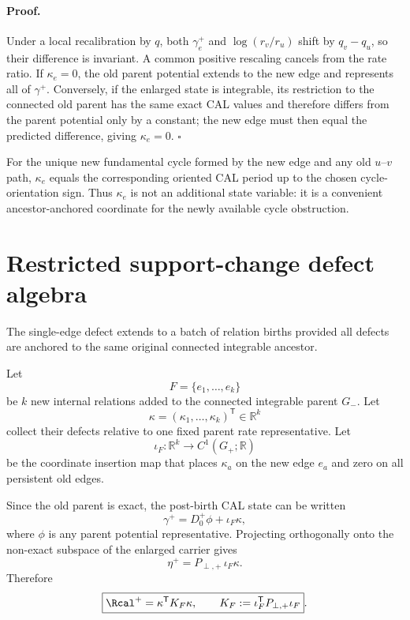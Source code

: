 \paragraph*{Proof.}
Under a local recalibration by $q$, both $\gamma^+_e$ and $\log(r_v/r_u)$ shift by $q_v-q_u$, so their difference is invariant. A common positive rescaling cancels from the rate ratio. If $\kappa_e=0$, the old parent potential extends to the new edge and represents all of $\gamma^+$. Conversely, if the enlarged state is integrable, its restriction to the connected old parent has the same exact CAL values and therefore differs from the parent potential only by a constant; the new edge must then equal the predicted difference, giving $\kappa_e=0$. \hfill$\square$

For the unique new fundamental cycle formed by the new edge and any old $u$--$v$ path, $\kappa_e$ equals the corresponding oriented CAL period up to the chosen cycle-orientation sign. Thus $\kappa_e$ is not an additional state variable: it is a convenient ancestor-anchored coordinate for the newly available cycle obstruction.

\section{Restricted support-change defect algebra}
\label{sec:defect}

The single-edge defect extends to a batch of relation births provided all defects are anchored to the same original connected integrable ancestor.

Let
\begin{equation}
F=\{e_1,\ldots,e_k\}
\end{equation}
be $k$ new internal relations added to the connected integrable parent $G_-$. Let
\begin{equation}
\kappa=(\kappa_1,\ldots,\kappa_k)^{\mathsf T}\in\mathbb R^k
\end{equation}
collect their defects relative to one fixed parent rate representative. Let
\begin{equation}
\iota_F:\mathbb R^k\longrightarrow C^1(G_+;\mathbb R)
\label{eq:defect-insertion-map}
\end{equation}
be the coordinate insertion map that places $\kappa_a$ on the new edge $e_a$ and zero on all persistent old edges.

Since the old parent is exact, the post-birth CAL state can be written
\begin{equation}
\gamma^+=D_0^+\phi+\iota_F\kappa,
\label{eq:birth-decomposition}
\end{equation}
where $\phi$ is any parent potential representative. Projecting orthogonally onto the non-exact subspace of the enlarged carrier gives
\begin{equation}
\boxed{
\eta^+=P_{\perp,+}\,\iota_F\kappa
}.
\label{eq:eta-after-birth}
\end{equation}
Therefore
\begin{equation}
\boxed{
\Rcal^+
=\kappa^{\mathsf T}K_F\kappa,
\qquad
K_F:=\iota_F^{\mathsf T}P_{\perp,+}\iota_F
}.
\label{eq:quadratic-kappa}
\end{equation}

